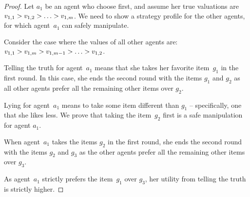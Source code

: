 \begin{proof}
    

    Let $a_1$ be an agent who choose first, and assume her true valuations are $v_{1,1} > v_{1,2} > \ldots > v_{1,m}$.
    We need to show a strategy profile for the other agents, for which agent~$a_1$ can safely manipulate. 

    Consider the case where the values of all other agents are: $v_{1,1} > v_{1,m} > v_{1,m-1} > \ldots > v_{1,2}$.

    Telling the truth for agent~$a_1$ means that she takes her favorite item~$g_1$ in the first round. In this case, she ends the second round with the items $g_1$ and $g_2$ as all other agents prefer all the remaining other items over $g_2$.

    Lying for agent~$a_1$ means to take some item different than $g_1$ -- specifically, one that she likes less. We prove that taking the item~$g_2$ first is a safe manipulation for agent $a_1$.
    
    When agent~$a_1$ takes the items $g_2$ in the first round, she ends the second round with the items $g_2$ and $g_3$ as the other agents prefer all the remaining other items over $g_3$. 

    As agent~$a_1$ strictly prefers the item~$g_1$ over $g_3$, her utility from telling the truth is strictly higher. 
    
\end{proof}



